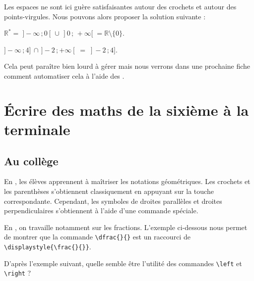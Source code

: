 \documentclass[10pt,french,openright,twoside]{book}
\begin{document}
Les espaces ne sont ici guère satisfaisantes autour des crochets et autour des points-virgules. Nous pouvons alors proposer la solution suivante :\bigskip

{\NewFont
\begin{SideBySideExample}
    $\mathds R^*=\; ]-\infty\, ; 0[\, \cup\,
                    ]0\, ;\, +\infty[\;
    =\mathds R \setminus \{0\}$.\par\medskip
    $]-\infty\, ; 4]\, \cap\, ]-2\, ; +\infty[ \;
    =\; ]-2\, ; 4]$.
\end{SideBySideExample}
}\bigskip

\begin{info}
    Cela peut paraître bien lourd à gérer mais nous verrons dans une prochaine fiche comment automatiser cela à l'aide des .
\end{info}

\section{\'Ecrire des maths de la sixième à la terminale}
\subsection{Au collège}

En , les élèves apprennent à maîtriser les notations géométriques. Les crochets et les parenthèses s'obtiennent classiquement en appuyant sur la touche correspondante. Cependant, les symboles de droites parallèles et droites perpendiculaires s'obtiennent à l'aide d'une commande spéciale.


En , on travaille notamment sur les fractions. L'exemple ci-dessous nous permet de montrer que la commande \verb!\dfrac{}{}! est un raccourci de \verb!\displaystyle{\frac{}{}}!.


D'après l'exemple suivant, quelle semble être l'utilité des commandes \verb!\left! et \verb!\right! ? \bigskip
\end{document}
